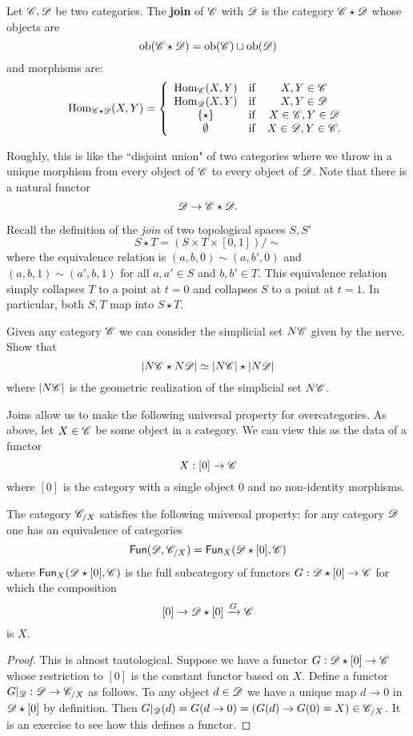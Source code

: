 \documentclass[11pt]{amsart}
\def\Fun{{\sf Fun}}
\begin{document}
\begin{dfn}
Let $\mathscr C,\mathscr D$ be two categories. 
The {\bf join} of $\mathscr C$ with $\mathscr D$ is the category $\mathscr C \star \mathscr D$ whose objects are 
\[
{\rm ob}(\mathscr C \star \mathscr D) = {\rm ob} (\mathscr C) \sqcup {\rm ob} (\mathscr D)
\]
and morphisms are:
\[
{\rm Hom}_{\mathscr C \star \mathscr D} (X, Y) =  \left\{  \begin{array}{ccccc} {\rm Hom}_{\mathscr C}(X,Y) & {\rm if} & X, Y \in \mathscr C \\ 
										       {\rm Hom}_{\mathscr D}(X,Y) & {\rm if} & X,Y \in \mathscr D \\ 
										       \{\star\} & {\rm if} & X \in \mathscr C , Y \in \mathscr D \\
										       \emptyset  & {\rm if} & X \in \mathscr D , Y \in \mathscr C . \end{array} \right.
\]
\end{dfn}

Roughly, this is like the ``disjoint union" of two categories where we throw in a unique morphism from every object of $\mathscr C$ to every object of $\mathscr D$. 
Note that there is a natural functor
\[
\mathscr D \to \mathscr C \star \mathscr D .
\]

\begin{ex} 
Recall the definition of the {\em join} of two topological spaces $S,S'$
\[
S \star T = (S \times T \times [0,1]) / \sim
\]
where the equivalence relation is $(a,b, 0) \sim (a,b', 0)$ and $(a,b,1) \sim (a',b,1)$ for all $a,a' \in S$ and $b,b' \in T$. 
This equivalence relation simply collapses $T$ to a point at $t = 0$ and collapses $S$ to a point at $t = 1$. 
In particular, both $S, T$ map into $S \star T$.

Given any category $\mathscr C$ we can consider the simplicial set $N\mathscr C$ given by the nerve. 
Show that
\[
|N\mathscr C \star N \mathscr D| \simeq |N \mathscr C| \star |N \mathscr D|
\]
where $|N \mathscr C|$ is the geometric realization of the simplicial set $N \mathscr C$. 
\end{ex}

Joins allow us to make the following universal property for overcategories. 
As above, let $X \in \mathscr C$ be some object in a category.
We can view this as the data of a functor
\[
X : [0] \to \mathscr C
\]
where $[0]$ is the category with a single object $0$ and no non-identity morphisms. 

\begin{lem}
The category $\mathscr C_{/X}$ satisfies the following universal property: for any category $\mathscr D$ one has an equivalence of categories
\[
\Fun(\sD, \sC_{/X}) = \Fun_{X} (\sD \star [0], \sC)
\]
where $\Fun_{X} (\sD \star [0], \sC)$ is the full subcategory of functors $G : \mathscr D \star [0] \to \mathscr C$ for which the composition 
\[
[0] \to \mathscr D \star [0] \xrightarrow{G} \mathscr C
\]
is $X$. 
\end{lem}
\begin{proof}
This is almost tautological. 
Suppose we have a functor $G : \mathscr D \star [0] \to \mathscr C$ whose restriction to $[0]$ is the constant functor based on $X$.
Define a functor $G |_{\mathscr D} : \mathscr D \to \mathscr C_{/X}$ as follows.
To any object $d \in \mathscr D$ we have a unique map $d \to 0$ in $\mathscr D \star [0]$ by definition. 
Then $G|_{\mathscr D} (d) = G(d \to 0) = \left(G(d) \to G(0) = X\right) \in \mathscr C_{/X}$. 
It is an exercise to see how this defines a functor. 
\end{proof}
\end{document}
